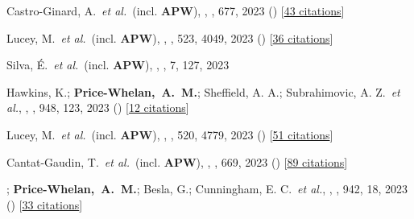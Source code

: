 \item[{\color{deemph}\scriptsize118}]Castro-Ginard, A.~\textit{et al.}~(incl. \textbf{APW}), , \aanda, 677, 2023 () [\href{http://adsabs.harvard.edu/abs/2023A&A...677A..37C}{43 citations}]

\item[{\color{deemph}\scriptsize117}]Lucey, M.~\textit{et al.}~(incl. \textbf{APW}), , \mnras, 523, 4049, 2023 () [\href{http://adsabs.harvard.edu/abs/2023MNRAS.523.4049L}{36 citations}]

\item[{\color{deemph}\scriptsize116}]Silva, {\'E}.~\textit{et al.}~(incl. \textbf{APW}), , \rnaas, 7, 127, 2023

\item[{\color{deemph}\scriptsize115}]Hawkins, K.; \textbf{Price-Whelan,~A.~M.}; Sheffield, A. A.; Subrahimovic, A. Z.~\textit{et al.}, , \apj, 948, 123, 2023 () [\href{http://adsabs.harvard.edu/abs/2023ApJ...948..123H}{12 citations}]

\item[{\color{deemph}\scriptsize114}]Lucey, M.~\textit{et al.}~(incl. \textbf{APW}), , \mnras, 520, 4779, 2023 () [\href{http://adsabs.harvard.edu/abs/2023MNRAS.520.4779L}{51 citations}]

\item[{\color{deemph}\scriptsize113}]Cantat-Gaudin, T.~\textit{et al.}~(incl. \textbf{APW}), , \aanda, 669, 2023 () [\href{http://adsabs.harvard.edu/abs/2023A&A...669A..55C}{89 citations}]

\item[{\color{deemph}\scriptsize112}]; \textbf{Price-Whelan,~A.~M.}; Besla, G.; Cunningham, E. C.~\textit{et al.}, , \apj, 942, 18, 2023 () [\href{http://adsabs.harvard.edu/abs/2023ApJ...942...18C}{33 citations}]

